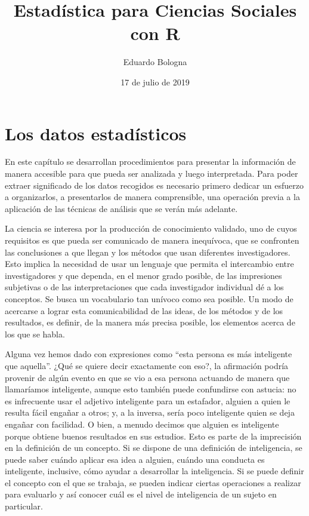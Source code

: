 \documentclass[]{book}
\title{Estadística para Ciencias Sociales con R}
\author{Eduardo Bologna}
\date{17 de julio de 2019}
\begin{document}
\maketitle

{
\setcounter{tocdepth}{1}
\tableofcontents
}
\hypertarget{section}{%
\chapter*{}\label{section}}

\hypertarget{los-datos-estadisticos}{%
\chapter{Los datos estadísticos}\label{los-datos-estadisticos}}

En este capítulo se desarrollan procedimientos para presentar la información de manera accesible para que pueda ser analizada y luego interpretada. Para poder extraer significado de los datos recogidos es necesario primero dedicar un esfuerzo a organizarlos, a presentarlos de manera comprensible, una operación previa a la aplicación de las técnicas de análisis que se verán más adelante.

La ciencia se interesa por la producción de conocimiento validado, uno de cuyos requisitos es que pueda ser comunicado de manera inequívoca, que se confronten las conclusiones a que llegan y los métodos que usan diferentes investigadores. Esto implica la necesidad de usar un lenguaje que permita el intercambio entre investigadores y que dependa, en el menor grado posible, de las impresiones subjetivas o de las interpretaciones que cada investigador individual dé a los conceptos. Se busca un vocabulario tan unívoco como sea posible. Un modo de acercarse a lograr esta comunicabilidad de las ideas, de los métodos y de los resultados, es definir, de la manera más precisa posible, los elementos acerca de los que se habla.

Alguna vez hemos dado con expresiones como ``esta persona es más inteligente que aquella''. ¿Qué se quiere decir exactamente con eso?, la afirmación podría provenir de algún evento en que se vio a esa persona actuando de manera que llamaríamos inteligente, aunque esto también puede confundirse con astucia: no es infrecuente usar el adjetivo inteligente para un estafador, alguien a quien le resulta fácil engañar a otros; y, a la inversa, sería poco inteligente quien se deja engañar con facilidad. O bien, a menudo decimos que alguien es inteligente porque obtiene buenos resultados en sus estudios. Esto es parte de la imprecisión en la definición de un concepto. Si se dispone de una definición de inteligencia, se puede saber cuándo aplicar esa idea a alguien, cuándo una conducta es inteligente, inclusive, cómo ayudar a desarrollar la inteligencia. Si se puede definir el concepto con el que se trabaja, se pueden indicar ciertas operaciones a realizar para evaluarlo y así conocer cuál es el nivel de inteligencia de un sujeto en particular.
\end{document}
